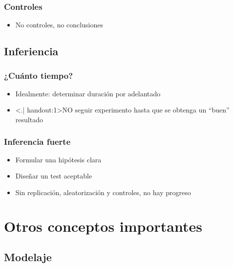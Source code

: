\documentclass[gray,handout,mathserif]{beamer}
\begin{document}
\begin{frame}[label=control]
\frametitle{Controles}
 \begin{itemize}
   \item No controles, no conclusiones
\end{itemize}
\end{frame}%


\subsection[Inferiencia]{Inferiencia}

\begin{frame}[label=howlong]
   \frametitle{¿Cu\'anto tiempo?}
   \begin{itemize}[<+-| handout:1>]
      \item Idealmente: determinar duraci\'on por adelantado 
      \item \alert<.| handout:1>{NO} seguir experimento hasta que se obtenga un ``buen'' resultado
   \end{itemize}
\end{frame}%


\begin{frame}[label=stronginfer]
   \frametitle{Inferencia fuerte}
   \begin{itemize}
      \item Formular una hip\'otesis clara
      \item Dise\~nar un test aceptable
      \medskip
      \item Sin replicaci\'on, aleatorizaci\'on y controles, no hay progreso
   \end{itemize}
\end{frame}%





\section[Otros conceptos]{Otros conceptos importantes}

\subsection[Modelaje]{Modelaje}
\end{document}
